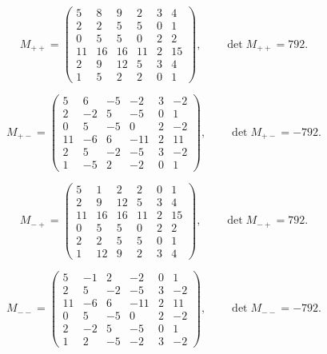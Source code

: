 \[
 M_{++}= \left(\begin{matrix}5 & 8 & 9 & 2 & 3 & 4\\2 & 2 & 5 & 5 & 0 & 1\\0 & 5 & 5 & 0 & 2 & 2\\11 & 16 & 16 & 11 & 2 & 15\\2 & 9 & 12 & 5 & 3 & 4\\1 & 5 & 2 & 2 & 0 & 1\end{matrix}\right),\qquad \det M_{++}=792.
\]

\[
 M_{+-}= \left(\begin{matrix}5 & 6 & -5 & -2 & 3 & -2\\2 & -2 & 5 & -5 & 0 & 1\\0 & 5 & -5 & 0 & 2 & -2\\11 & -6 & 6 & -11 & 2 & 11\\2 & 5 & -2 & -5 & 3 & -2\\1 & -5 & 2 & -2 & 0 & 1\end{matrix}\right),\qquad \det M_{+-}=-792.
\]

\[
 M_{-+}= \left(\begin{matrix}5 & 1 & 2 & 2 & 0 & 1\\2 & 9 & 12 & 5 & 3 & 4\\11 & 16 & 16 & 11 & 2 & 15\\0 & 5 & 5 & 0 & 2 & 2\\2 & 2 & 5 & 5 & 0 & 1\\1 & 12 & 9 & 2 & 3 & 4\end{matrix}\right),\qquad \det M_{-+}=792.
\]

\[
 M_{--}= \left(\begin{matrix}5 & -1 & 2 & -2 & 0 & 1\\2 & 5 & -2 & -5 & 3 & -2\\11 & -6 & 6 & -11 & 2 & 11\\0 & 5 & -5 & 0 & 2 & -2\\2 & -2 & 5 & -5 & 0 & 1\\1 & 2 & -5 & -2 & 3 & -2\end{matrix}\right),\qquad \det M_{--}=-792.
\]
